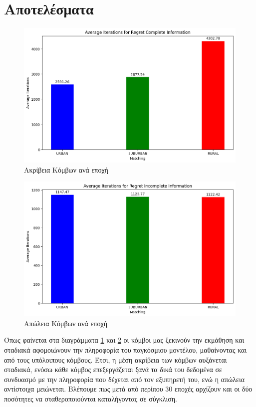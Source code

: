 \section{Αποτελέσματα}

\begin{figure}[H]
    \centering
    \includegraphics[width=\textwidth]{figures/chapter4/Average_Iterations_per_area_RCI.png}
    \caption{Ακρίβεια Κόμβων ανά εποχή}
    \label{fig1}
\end{figure}

\begin{figure}[H]
    \centering
    \includegraphics[width=\textwidth]{figures/chapter4/Average_Iterations_per_area_RII.png}
    \caption{Απώλεια Κόμβων ανά εποχή}
    \label{fig2}
\end{figure}

\newpage

Όπως φαίνεται στα διαγράμματα \ref{fig1} και \ref{fig2} οι κόμβοι μας ξεκινούν την εκμάθηση και σταδιακά αφομοιώνουν την πληροφορία του παγκόσμιου μοντέλου, μαθαίνοντας και από τους υπόλοιπους κόμβους. Έτσι, η μέση ακρίβεια των κόμβων αυξάνεται σταδιακά, ενόσω κάθε κόμβος επεξεργάζεται ξανά τα δικά του δεδομένα σε συνδυασμό με την πληροφορία που δέχεται από τον εξυπηρετή του, ενώ η απώλεια αντίστοιχα μειώνεται. Βλέπουμε πως μετά από περίπου 30 εποχές αρχίζουν και οι δύο ποσότητες να σταθεροποιούνται καταλήγοντας σε σύγκλιση.

